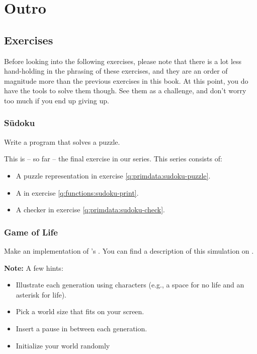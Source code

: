 \chapter{Outro}




\section{Exercises}

Before looking into the following exercises, please note that there is a lot less hand-holding in the phrasing of these exercises, and they are an order of magnitude more  than the previous exercises in this book. At this point, you do have the tools to solve them though. See them as a challenge, and don't worry too much if you end up giving up.

\subsection{Sūdoku}

Write a program that solves a puzzle.

This is -- so far -- the final exercise in our  series. This series consists of:
\begin{itemize}
  \item A puzzle representation in exercise \ref{q:primdata:sudoku-puzzle}.
  \item A  in exercise \ref{q:functions:sudoku-print}.
  \item A checker in exercise \ref{q:primdata:sudoku-check}.
\end{itemize}

\subsection{Game of Life}

Make an implementation of 's . You can find a description of this simulation on .

\textbf{Note:} A few hints:
\begin{itemize}
  \item Illustrate each generation using characters (e.g., a space for no life and an asterisk for life).
  \item Pick a world size that fits on your screen.
  \item Insert a pause in between each generation.
  \item Initialize your world randomly
\end{itemize}

